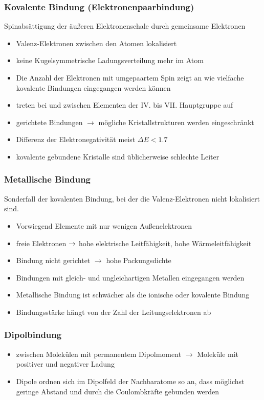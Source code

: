 \documentclass[eglish/german]{latex4ei/latex4ei_sheet}
\begin{document}
	
	\begin{sectionbox}

		\subsubsection{Kovalente Bindung (Elektronenpaarbindung)}
		Spinabsättigung der äußeren Elektronenschale durch gemeinsame Elektronen
	  
		\begin{itemize}
			\item Valenz-Elektronen zwischen den Atomen lokalisiert
			\item keine Kugelsymmetrische Ladungsverteilung mehr im Atom
			\item Die Anzahl der Elektronen mit umgepaartem Spin zeigt an wie vielfache kovalente Bindungen eingegangen werden können
			\item treten bei und zwischen Elementen der IV. bis VII. Hauptgruppe auf
			\item gerichtete Bindungen $\rightarrow$ mögliche Kristallstrukturen werden eingeschränkt
			\item Differenz der Elektronegativität meist $\Delta E<1.7$
			\item kovalente gebundene Kristalle sind üblicherweise schlechte Leiter 
		\end{itemize}

		\subsubsection{Metallische Bindung}
	Sonderfall der kovalenten Bindung, bei der die Valenz-Elektronen nicht lokalisiert sind.
	\begin{itemize}
    	\item Vorwiegend Elemente mit nur wenigen Außenelektronen
		\item freie Elektronen $\rightarrow $ hohe elektrische Leitfähigkeit, hohe Wärmeleitfähigkeit
		\item Bindung nicht gerichtet $\rightarrow$ hohe Packungsdichte 
		\item Bindungen mit gleich- und ungleichartigen Metallen eingegangen werden
		\item Metallische Bindung ist schwächer als die ionische oder kovalente Bindung
		\item Bindungsstärke hängt von der Zahl der Leitungselektronen ab
	\end{itemize}
	
\subsubsection{Dipolbindung}
	\begin{itemize}
		\item zwischen Molekülen mit permanentem Dipolmoment $\rightarrow$ Moleküle mit positiver und negativer Ladung 
		\item Dipole ordnen sich im Dipolfeld der Nachbaratome so an, dass möglichst geringe Abstand und durch die Coulombkräfte gebunden werden 
    \end{itemize}


\end{sectionbox}
\end{document}
